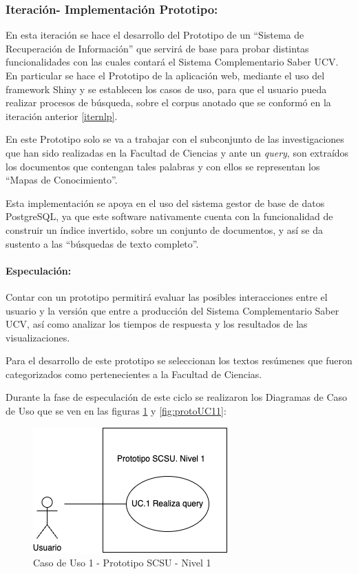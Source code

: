 \documentclass[
  12pt,
  openany]{book}
\begin{document}
\hypertarget{iterbol}{%
\subsubsection{Iteración- Implementación Prototipo:}\label{iterbol}}

En esta iteración se hace el desarrollo del Prototipo de un ``Sistema de Recuperación de Información'' que servirá de base para probar distintas funcionalidades con las cuales contará el Sistema Complementario Saber UCV. En particular se hace el Prototipo de la aplicación web, mediante el uso del framework Shiny \citep{shiny-2} y se establecen los casos de uso, para que el usuario pueda realizar procesos de búsqueda, sobre el corpus anotado que se conformó en la iteración anterior \ref{iternlp}.

En este Prototipo solo se va a trabajar con el subconjunto de las investigaciones que han sido realizadas en la Facultad de Ciencias y ante un \emph{query}, son extraídos los documentos que contengan tales palabras y con ellos se representan los ``Mapas de Conocimiento''.

Esta implementación se apoya en el uso del sistema gestor de base de datos PostgreSQL, ya que este software nativamente cuenta con la funcionalidad de construir un índice invertido, sobre un conjunto de documentos, y así se da sustento a las ``búsquedas de texto completo''.

\hypertarget{especulaciuxf3n-6}{%
\paragraph{Especulación:}\label{especulaciuxf3n-6}}

Contar con un prototipo permitirá evaluar las posibles interacciones entre el usuario y la versión que entre a producción del Sistema Complementario Saber UCV, así como analizar los tiempos de respuesta y los resultados de las visualizaciones.

Para el desarrollo de este prototipo se seleccionan los textos resúmenes que fueron categorizados como pertenecientes a la Facultad de Ciencias.

Durante la fase de especulación de este ciclo se realizaron los Diagramas de Caso de Uso que se ven en las figuras \ref{fig:protoUC1} y \ref{fig:protoUC11}:

\newpage

\begin{figure}

{\centering \includegraphics[width=0.45\linewidth]{images/05-desarrollo/2_ciclo/UC/prototipo_nivel1} 

}

\caption{Caso de Uso 1 - Prototipo SCSU - Nivel 1}\label{fig:protoUC1}
\end{figure}
\end{document}
